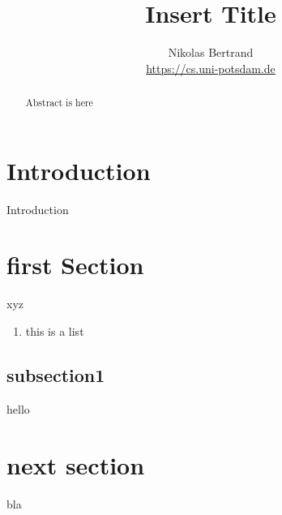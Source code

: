 \documentclass[runningheads]{llncs}
\begin{document}
%
\title{Insert Title}
%
%
\author{Nikolas Bertrand
%
%
\\
\url{https://cs.uni-potsdam.de}}
%

\maketitle              %
%
\begin{abstract}
Abstract is here

\end{abstract}
%
%
%
\section{Introduction}

Introduction

\section{first Section}

xyz
\begin{enumerate}
	\item this is a list
		
\end{enumerate}

 
\subsection{subsection1}
 hello
 \section{next section} 
bla

\end{document}
